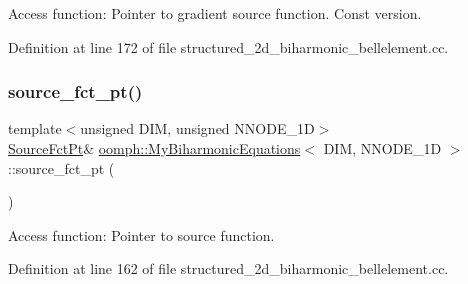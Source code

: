 Access function\+: Pointer to gradient source function. Const version. 



Definition at line 172 of file structured\+\_\+2d\+\_\+biharmonic\+\_\+bellelement.\+cc.

\mbox{\label{classoomph_1_1MyBiharmonicEquations_afbb201cb342fef337cfce82a776fa2b3}} 
\subsubsection{\texorpdfstring{source\+\_\+fct\+\_\+pt()}{source\_fct\_pt()}\hspace{0.1cm}{\footnotesize\ttfamily [1/2]}}
{\footnotesize\ttfamily template$<$unsigned D\+IM, unsigned N\+N\+O\+D\+E\+\_\+1D$>$ \\
\hyperlink{classoomph_1_1MyBiharmonicEquations_a17bd58054c66229016eb1c52eab36bc1}{Source\+Fct\+Pt}\& \hyperlink{classoomph_1_1MyBiharmonicEquations}{oomph\+::\+My\+Biharmonic\+Equations}$<$ D\+IM, N\+N\+O\+D\+E\+\_\+1D $>$\+::source\+\_\+fct\+\_\+pt (\begin{DoxyParamCaption}{ }\end{DoxyParamCaption})\hspace{0.3cm}{\ttfamily [inline]}}



Access function\+: Pointer to source function. 



Definition at line 162 of file structured\+\_\+2d\+\_\+biharmonic\+\_\+bellelement.\+cc.

\mbox{\label{classoomph_1_1MyBiharmonicEquations_a1c2d7933266cf773e3729fb236bc13be}} 
